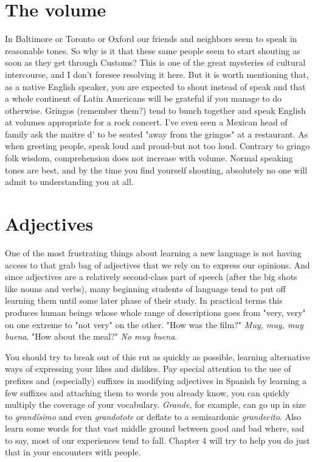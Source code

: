 \documentclass[14pt,a4paper,oneside]{memoir}
\begin{document}
\section{The volume}

In Baltimore or Toronto or Oxford our friends and neighbors
seem to speak in reasonable tones. So why is it that these same people
seem to start shouting as soon as they get through Customs? This is
one of the great mysteries of cultural intercourse, and I don't foresee
resolving it here. But it is worth mentioning that, as a native English
speaker, you are expected to shout instead of speak and that a whole
continent of Latin Americans will be grateful if you manage to do otherwise. Gringos (remember them?) tend to bunch together and speak
English at volumes appropriate for a rock concert. I've even seen a
Mexican head of family ask the maitre d' to be seated "away from the
gringos" at a restaurant. As when greeting people, speak loud and
proud-but not too loud. Contrary to gringo folk wisdom, comprehension does not increase with volume. Normal speaking tones are best,
and by the time you find yourself shouting, absolutely no one will admit to understanding you at all.

\section{Adjectives}

One of the most frustrating things about learning a new language is not having access to that grab bag of adjectives that we rely on
to express our opinions. And since adjectives are a relatively second-class part of speech (after the big shots like nouns and verbs), many
beginning students of language tend to put off learning them until
some later phase of their study. In practical terms this produces human
beings whose whole range of descriptions goes from "very, very" on
one extreme to "not very" on the other. "How was the film?" \emph{Muy,
	muy, muy buena}. "How about the meal?" \emph{No muy buena}.

You should try to break out of this rut as quickly as possible,
learning alternative ways of expressing your likes and dislikes. Pay special attention to the use of prefixes and (especially) suffixes in modifying adjectives in Spanish by learning a few suffixes and attaching
them to words you already know, you can quickly multiply the coverage of your vocabulary. \emph{Grande}, for example, can go up in size to \emph{grandísimo} and even \emph{grandotote} or deflate to a semisardonic \emph{grandecito}.
Also learn some words for that vast middle ground between good and
bad where, sad to say, most of our experiences tend to fall. Chapter 4
will try to help you do just that in your encounters with people.
\end{document}
